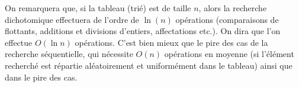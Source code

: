On remarquera que, si la tableau  (trié) est de taille $n$, alors la recherche dichotomique effectuera de l'ordre de $\ln(n)$ opérations (comparaisons de flottants, additions et divisions d'entiers, affectations etc.).
On dira que l'on effectue $O(\ln n)$ opérations.
C'est bien mieux que le pire des cas de la recherche séquentielle, qui nécessite $O(n)$ opérations \og en moyenne \fg{} (si l'élément recherché est répartie aléatoirement et uniformément dans le tableau) ainsi que dans le pire des cas.
%
%
%
%
%
%
%
%
%

